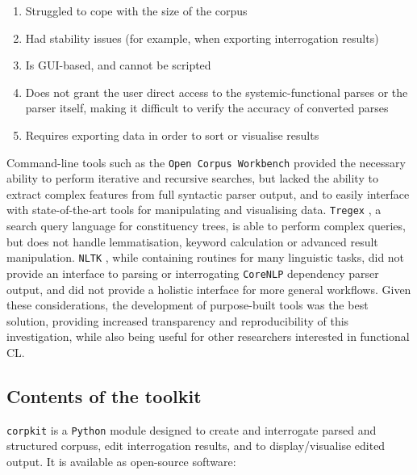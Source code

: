 %
\begin{enumerate}
\item Struggled to cope with the size of the corpus
\item Had stability issues (for example, when exporting interrogation results)
\item Is \gls{GUI}\hyp{}based, and cannot be scripted
\item Does not grant the user direct access to the systemic\hyp{}functional parses or the parser itself, making it difficult to verify the accuracy of converted parses
\item Requires exporting data in order to sort or visualise results
\end{enumerate}
%
Command\hyp{}line tools such as the \texttt{Open Corpus Workbench} \cite{evert2011twenty} provided the necessary ability to perform iterative and recursive searches, but lacked the ability to extract complex features from full syntactic parser output, and to easily interface with state\hyp{}of\hyp{}the\hyp{}art tools for manipulating and visualising data. \texttt{Tregex} \cite{levy2006tregex}, a search query language for constituency trees, is able to perform complex queries, but does not handle lemmatisation, keyword calculation or advanced result manipulation. \texttt{NLTK} \cite{bird2009natural}, while containing routines for many linguistic tasks, did not provide an interface to parsing or interrogating \texttt{CoreNLP} dependency parser output, and did not provide a holistic interface for more general workflows. Given these considerations, the development of purpose\hyp{}built tools was the best solution, providing increased transparency and reproducibility of this investigation, while also being useful for other researchers interested in functional \gls{CL}.

\subsection{Contents of the toolkit}

\texttt{corpkit} is a \texttt{Python} module designed to create and interrogate parsed and structured \glspl{corpus}, edit interrogation results, and to display\slash visualise edited output. It is available as open\hyp{}source software:

